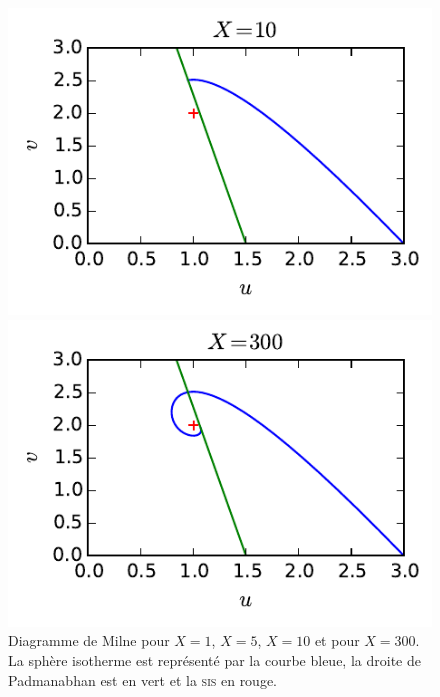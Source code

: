 \begin{figure}[h!]
\begin{minipage}[b]{0.40\linewidth}
			\centering \includegraphics{graphe/milne_X10.pdf}
		\end{minipage}\hfill
		\begin{minipage}[b]{0.48\linewidth}
			\centering \includegraphics{graphe/milne_X300.pdf}
		\end{minipage}
		\caption{Diagramme de Milne pour $X=1$, $X=5$, $X=10$ et pour $X=300$. La sphère isotherme est
		représenté par la courbe bleue, la droite de Padmanabhan est en vert et la \textsc{sis} en rouge.}
		\label{Milne}
	\end{figure}

